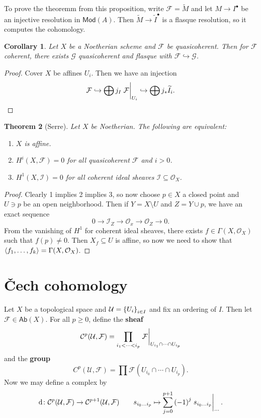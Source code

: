 \documentclass[leqno, openany]{memoir}
\newtheorem{thm}{Theorem}[section]
\newtheorem{cor}[thm]{Corollary}
\theoremstyle{definition}
\theoremstyle{remark}
\theoremstyle{plain}
\theoremstyle{definition}
\theoremstyle{remark}
\newcommand{\mc}[1]{\mathcal{#1}}
\newcommand{\ms}[1]{\mathsf{#1}}
\newcommand{\wt}[1]{\widetilde{#1}}
\begin{document}
To prove the theoremm from this proposition, write $\mc{F} = \wt{M}$ and let $M
\to I^{\bullet}$ be an injective resolution in $\ms{Mod}(A)$. Then $\wt{M} \to
\wt{I}^{\bullet}$ is a flasque resolution, so it computes the cohomology.

\begin{cor} Let $X$ be a Noetherian scheme and $\mc{F}$ be quasicoherent. Then
for $\mc{F}$ coherent, there exists $\mc{G}$ quasicoherent and flasque with
$\mc{F} \hookrightarrow \mc{G}$.  \end{cor}

\begin{proof} Cover $X$ be affines $U_i$. Then we have an injection \[ \mc{F}
\hookrightarrow \bigoplus j_I \eval{\mc{F}}_{U_i} \hookrightarrow \bigoplus j_*
\wt{I}_i. \qedhere \] \end{proof}

\begin{thm}[Serre] Let $X$ be Noetherian. The following are equivalent:
    \begin{enumerate} \item $X$ is affine.  \item $H^i(X, \mc{F}) = 0$ for all
        quasicoherent $\mc{F}$ and $i>0$.  \item $H^1(X, \mc{I}) = 0$ for all
        coherent ideal sheaves $\mc{I} \subseteq \mc{O}_X$.  \end{enumerate}
    \end{thm}

\begin{proof} Clearly 1 implies 2 implies 3, so now choose $p \in X$ a closed
    point and $U \ni p$ be an open neighborhood. Then if $Y = X \setminus U$
    and $Z = Y \cup p$, we have an exact sequence \[ 0 \to \mc{I}_Z \to
    \mc{O}_x \to \mc{O}_Z \to 0. \] From the vanishing of $H^1$ for coherent
    ideal sheaves, there exists $f \in \Gamma(X, \mc{O}_X)$ such that $f(p)
    \neq 0$. Then $X_f \subseteq U$ is affine, so now we need to show that
    $\ev{f_1, \ldots, f_k} = \Gamma(X, \mc{O}_X)$.  \end{proof}

\section{\v{C}ech cohomology}%

Let $X$ be a topological space and $\mc{U} = \qty{U_i}_{i \in I}$ and fix an
ordering of $I$. Then let $\mc{F} \in \ms{Ab}(X)$. For all $p \geq 0$, define
the \textbf{sheaf} \[ \mc{C}^p(\mc{U}, \mc{F}) =  \prod_{i_1 < \cdots < i_p}
\eval{\mc{F}}_{U_{i_1} \cap \cdots \cap U_{i_p}} \] and the \textbf{group} \[
C^p(\mc{U}, \mc{F}) = \prod \mc{F}(U_{i_0} \cap \cdots \cap U_{i_p}). \] Now we
may define a complex by \[ \dd \colon \mc{C}^p(\mc{U}, \mc{F}) \to
\mc{C}^{p+1}(\mc{U}, \mc{F}) \qquad {s_{i_0\ldots i_p}} \mapsto
\sum_{j=0}^{p+1} {(-1)}^j \eval{ s_{i_0 \ldots i_p} }_{\cdots}. \]
\end{document}
